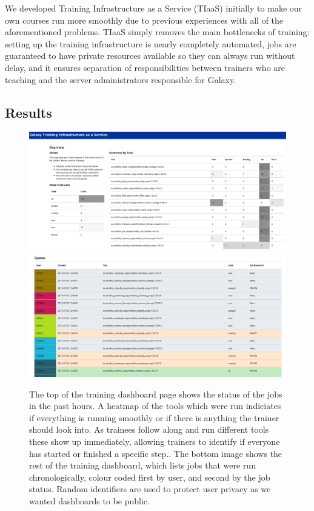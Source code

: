 \documentclass[a4paper,num-refs]{oup-contemporary}
\begin{document}
We developed Training Infrastructure as a Service (TIaaS) initially to make our own courses run more smoothly due to previous experiences with all of the aforementioned problems. TIaaS simply removes the main bottlenecks of training: setting up the training infrastructure is nearly completely automated, jobs are guaranteed to have private resources available so they can always run without delay, and it ensures separation of responsibilities between trainers who are teaching and the server administrators responsible for Galaxy.

\subsection{Results}
\begin{figure}[bt!]
\centering
\includegraphics[width=\linewidth]{images/dashboard.png}
\includegraphics[width=\linewidth]{images/queue.png}
\caption{The top of the training dashboard page shows the status of the jobs in the past hours. A heatmap of the tools which were run indiciates if everything is running smoothly or if there is anything the trainer should look into. As trainees follow along and run different tools these show up immediately, allowing trainers to identify if everyone has started or finished a specific step.. The bottom image shows the rest of the training dashboard, which lists jobs that were run chronologically, colour coded first by user, and second by the job status. Random identifiers are used to protect user privacy as we wanted dashboards to be public.}\label{figure:dashboard}
\end{figure}
\end{document}
